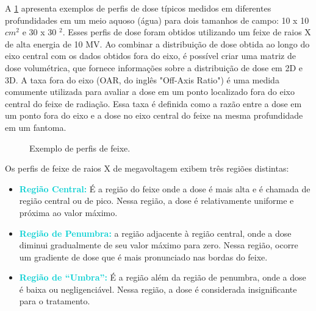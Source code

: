 \documentclass[11pt,a4paper]{article}
\newcounter{exemplo}
\begin{document}
    A \ref{fig:perfiDeFeixe} apresenta exemplos de perfis de dose típicos medidos em diferentes profundidades em um meio aquoso (água) para dois tamanhos de campo: 10 x 10 $cm^2$ e 30 x 30 $^2$. Esses perfis de dose foram obtidos utilizando um feixe de raios X de alta energia de 10 MV. Ao combinar a distribuição de dose obtida ao longo do eixo central com os dados obtidos fora do eixo, é possível criar uma matriz de dose volumétrica, que fornece informações sobre a distribuição de dose em 2D e 3D. A taxa fora do eixo (OAR, do inglês "Off-Axis Ratio") é uma medida comumente utilizada para avaliar a dose em um ponto localizado fora do eixo central do feixe de radiação. Essa taxa é definida como a razão entre a dose em um ponto fora do eixo e a dose no eixo central do feixe na mesma profundidade em um fantoma.

    \begin{figure}[h]
        \centering
        \caption{Exemplo de perfis de feixe.}
        \label{fig:perfiDeFeixe}
    \end{figure}

    Os perfis de feixe de raios X de megavoltagem exibem três regiões distintas:
    \begin{itemize}
        \item \textcolor{DarkTurquoise}{\textbf{Região Central:}}  É a região do feixe onde a dose é mais alta e é chamada de região central ou de pico. Nessa região, a dose é relativamente uniforme e próxima ao valor máximo.
        \item \textcolor{DarkTurquoise}{\textbf{Região de Penumbra:}}  a região adjacente à região central, onde a dose diminui gradualmente de seu valor máximo para zero. Nessa região, ocorre um gradiente de dose que é mais pronunciado nas bordas do feixe.
        \item \textcolor{DarkTurquoise}{\textbf{Região de ``Umbra'':}}  É a região além da região de penumbra, onde a dose é baixa ou negligenciável. Nessa região, a dose é considerada insignificante para o tratamento.
    \end{itemize}
\end{document}
